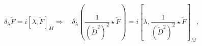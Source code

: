 \begin{equation}
\delta_\lambda \tilde F = i[\lambda, \tilde F]_M \Longrightarrow \quad
\delta_\lambda(\frac1{(\tilde D^2)^2}\star\tilde F) =
i[\lambda,\frac1{(\tilde D^2)^2}\star\tilde F]_M, 
\end{equation}

